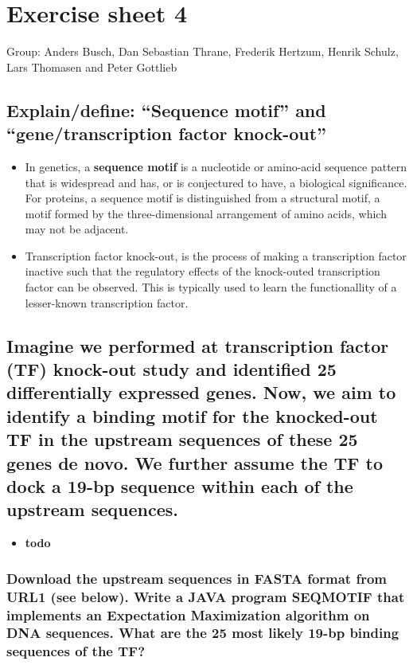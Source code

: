 \documentclass[a4paper,10pt,titlepage]{article}
\begin{document}
\section*{Exercise sheet 4}

Group: Anders Busch, Dan Sebastian Thrane, Frederik Hertzum, Henrik Schulz, Lars Thomasen and Peter Gottlieb

\subsection*{Explain/define: “Sequence motif” and “gene/transcription factor knock-out”}

\begin{itemize}
\item
In genetics, a \textbf{sequence motif} is a nucleotide or amino-acid sequence pattern that is widespread and has, or is conjectured to have, a biological significance. For proteins, a sequence motif is distinguished from a structural motif, a motif formed by the three-dimensional arrangement of amino acids, which may not be adjacent.
\item
Transcription factor knock-out, is the process of making a transcription factor inactive such that the regulatory effects of the knock-outed transcription factor can be observed. This is typically used to learn the functionallity of a lesser-known transcription factor.
\end{itemize}

\subsection*{Imagine we performed at transcription factor (TF) knock-out study and identified 25 differentially expressed genes. Now, we aim to identify a binding motif for the knocked-out TF in the upstream sequences of these 25 genes de novo. We further assume the TF to dock a 19-bp sequence within each of the upstream sequences. }

\begin{itemize}
\item
\textbf{todo}
\end{itemize}

\subsubsection{Download the upstream sequences in FASTA format from URL1 (see below). Write a JAVA program SEQMOTIF that implements an Expectation Maximization algorithm on DNA sequences. What are the 25 most likely 19-bp binding sequences of the TF?}
\end{document}
